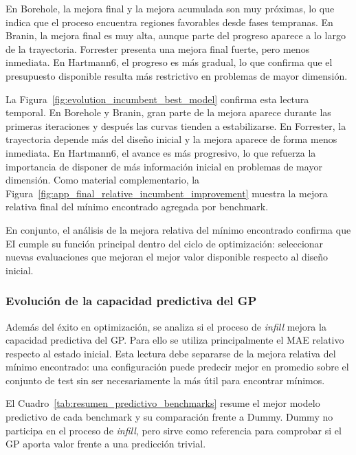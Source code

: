En Borehole, la mejora final y la mejora acumulada son muy próximas, lo que indica que el proceso encuentra regiones favorables desde fases tempranas. En Branin, la mejora final es muy alta, aunque parte del progreso aparece a lo largo de la trayectoria. Forrester presenta una mejora final fuerte, pero menos inmediata. En Hartmann6, el progreso es más gradual, lo que confirma que el presupuesto disponible resulta más restrictivo en problemas de mayor dimensión.

La Figura~\ref{fig:evolution_incumbent_best_model} confirma esta lectura temporal. En Borehole y Branin, gran parte de la mejora aparece durante las primeras iteraciones y después las curvas tienden a estabilizarse. En Forrester, la trayectoria depende más del diseño inicial y la mejora aparece de forma menos inmediata. En Hartmann6, el avance es más progresivo, lo que refuerza la importancia de disponer de más información inicial en problemas de mayor dimensión. Como material complementario, la Figura~\ref{fig:app_final_relative_incumbent_improvement} muestra la mejora relativa final del mínimo encontrado agregada por benchmark.

En conjunto, el análisis de la mejora relativa del mínimo encontrado confirma que EI cumple su función principal dentro del ciclo de optimización: seleccionar nuevas evaluaciones que mejoran el mejor valor disponible respecto al diseño inicial.

\subsubsection{Evolución de la capacidad predictiva del GP}
\label{subsubsec:resultados_mae_benchmarks}

Además del éxito en optimización, se analiza si el proceso de \emph{infill} mejora la capacidad predictiva del GP. Para ello se utiliza principalmente el MAE relativo respecto al estado inicial. Esta lectura debe separarse de la mejora relativa del mínimo encontrado: una configuración puede predecir mejor en promedio sobre el conjunto de test sin ser necesariamente la más útil para encontrar mínimos.

El Cuadro~\ref{tab:resumen_predictivo_benchmarks} resume el mejor modelo predictivo de cada benchmark y su comparación frente a Dummy. Dummy no participa en el proceso de \emph{infill}, pero sirve como referencia para comprobar si el GP aporta valor frente a una predicción trivial.

